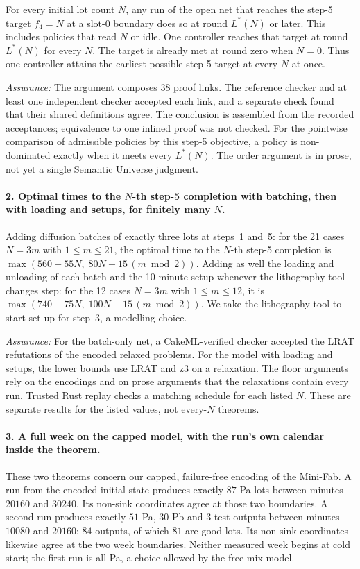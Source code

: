 For every initial lot count $N$, any run of the open net that reaches
the step-5 target $f_4=N$ at a slot-0 boundary does so at round
$L^\ast(N)$ or later. This includes policies that read $N$ or idle.
One controller reaches that target at round $L^\ast(N)$ for every $N$.
The target is already met at round zero when $N=0$. Thus one controller
attains the earliest possible step-5 target at every $N$ at once.

\emph{Assurance:} The argument composes 38 proof links. The reference
checker and at least one independent checker accepted each link, and a
separate check found that their shared definitions agree. The conclusion
is assembled from the recorded acceptances; equivalence to one inlined
proof was not checked. For the pointwise comparison of admissible
policies by this step-5 objective, a policy is non-dominated exactly
when it meets every $L^\ast(N)$. The order argument is in prose, not
yet a single Semantic Universe judgment.

\paragraph{2. Optimal times to the $N$-th step-5 completion with
batching, then with loading and setups, for finitely many $N$.}
Adding diffusion batches of exactly three lots at steps~1 and~5: for
the 21 cases $N = 3m$ with $1 \le m \le 21$, the optimal time to the
$N$-th step-5 completion is
$\max(560 + 55N,\; 80N + 15\,(m \bmod 2))$. Adding as well the loading
and unloading of each batch and the 10-minute setup whenever the
lithography tool changes step: for the 12 cases $N = 3m$ with
$1 \le m \le 12$, it is $\max(740 + 75N,\; 100N + 15\,(m \bmod 2))$.
We take the lithography tool to start set up for step~3, a modelling
choice.

\emph{Assurance:} For the batch-only net, a CakeML-verified checker
accepted the LRAT refutations of the encoded relaxed problems. For the
model with loading and setups, the lower bounds use LRAT and z3 on a
relaxation. The floor arguments rely on the encodings and on prose
arguments that the relaxations contain every run. Trusted Rust replay
checks a matching schedule for each listed $N$. These are separate
results for the listed values, not every-$N$ theorems.

\paragraph{3. A full week on the capped model, with the run's own
calendar inside the theorem.}
These two theorems concern our capped, failure-free encoding of the
Mini-Fab. A run from the encoded initial state produces exactly $87$ Pa
lots between minutes $20160$ and $30240$. Its non-sink coordinates agree
at those two boundaries. A second run produces exactly $51$ Pa, $30$ Pb
and $3$ test outputs between minutes $10080$ and $20160$: $84$ outputs,
of which $81$ are good lots. Its non-sink coordinates likewise agree at
the two week boundaries. Neither measured week begins at cold start; the
first run is all-Pa, a choice allowed by the free-mix model.

